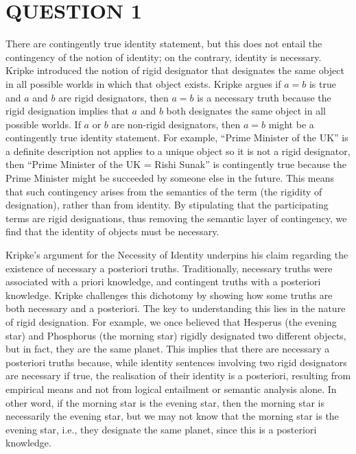 \section*{QUESTION 1}
There are contingently true identity statement, but this does not entail the contingency of the notion of identity; on the contrary, identity is necessary. Kripke introduced the notion of rigid designator that designates the same object in all possible worlds in which that object exists. Kripke argues if $a=b$ is true and $a$ and $b$ are rigid designators, then $a=b$ is a necessary truth because the rigid designation implies that $a$ and $b$ both designates the same object in all possible worlds. If $a$ or $b$ are non-rigid designators, then $a=b$ might be a contingently true identity statement. For example, ``Prime Minister of the UK'' is a definite description not applies to a unique object so it is not a rigid designator, then ``Prime Minister of the UK = Rishi Sunak'' is contingently true because the Prime Minister might be succeeded by someone else in the future. This means that such contingency arises from the semantics of the term (the rigidity of designation), rather than from identity. By stipulating that the participating terms are rigid designations, thus removing the semantic layer of contingency, we find that the identity of objects must be necessary.

Kripke's argument for the Necessity of Identity underpins his claim regarding the existence of necessary a posteriori truths. Traditionally, necessary truths were associated with a priori knowledge, and contingent truths with a posteriori knowledge. Kripke challenges this dichotomy by showing how some truths are both necessary and a posteriori. The key to understanding this lies in the nature of rigid designation. For example, we once believed that Hesperus (the evening star) and Phosphorus (the morning star) rigidly designated two different objects, but in fact, they are the same planet. This implies that there are necessary a posteriori truths because, while identity sentences involving two rigid designators are necessary if true, the realisation of their identity is a posteriori, resulting from empirical means and not from logical entailment or semantic analysis alone. In other word, if the morning star is the evening star, then the morning star is necessarily the evening star, but we may not know that the morning star is the evening star, i.e., they designate the same planet, since this is a posteriori knowledge.

\newpage